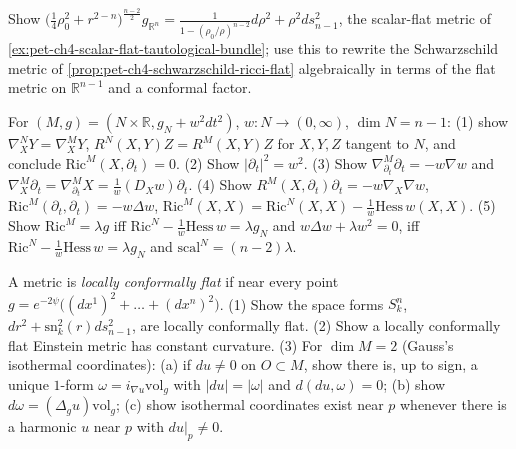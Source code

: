 \begin{remark}
  \label{rem:pet-ch4-ex-15}
  Show
  $\big(\tfrac14\rho_0^2+r^{2-n}\big)^{\frac{n-2}2}g_{\mathbb{R}^n}
  =\tfrac1{1-(\rho_0/\rho)^{n-2}}d\rho^2+\rho^2ds_{n-1}^2$, the scalar-flat
  metric of \cref{ex:pet-ch4-scalar-flat-tautological-bundle}; use this to
  rewrite the Schwarzschild metric of \cref{prop:pet-ch4-schwarzschild-ricci-flat}
  algebraically in terms of the flat metric on $\mathbb{R}^{n-1}$ and a conformal
  factor.
\end{remark}

\begin{remark}
  \label{rem:pet-ch4-ex-16}
  For $(M,g)=(N\times\mathbb{R},g_N+w^2dt^2)$, $w:N\to(0,\infty)$, $\dim N=n-1$: (1)
  show $\nabla^N_XY=\nabla^M_XY$, $R^N(X,Y)Z=R^M(X,Y)Z$ for $X,Y,Z$ tangent to
  $N$, and conclude $\mathrm{Ric}^M(X,\partial_t)=0$. (2) Show $|\partial_t|^2=w^2$.
  (3) Show $\nabla^M_{\partial_t}\partial_t=-w\nabla w$ and
  $\nabla^M_X\partial_t=\nabla^M_{\partial_t}X=\tfrac1w(D_Xw)\partial_t$. (4)
  Show $R^M(X,\partial_t)\partial_t=-w\nabla_X\nabla w$,
  $\mathrm{Ric}^M(\partial_t,\partial_t)=-w\Delta w$,
  $\mathrm{Ric}^M(X,X)=\mathrm{Ric}^N(X,X)-\tfrac1w\mathrm{Hess}\,w(X,X)$. (5) Show
  $\mathrm{Ric}^M=\lambda g$ iff $\mathrm{Ric}^N-\tfrac1w\mathrm{Hess}\,w=\lambda g_N$
  and $w\Delta w+\lambda w^2=0$, iff
  $\mathrm{Ric}^N-\tfrac1w\mathrm{Hess}\,w=\lambda g_N$ and $\mathrm{scal}^N=(n-2)\lambda$.
\end{remark}

\begin{remark}
  \label{rem:pet-ch4-ex-17}
  A metric is \emph{locally conformally flat} if near every point
  $g=e^{-2\psi}\big((dx^1)^2+\dots+(dx^n)^2\big)$. (1) Show the space forms
  $S^n_k$, $dr^2+\mathrm{sn}_k^2(r)ds_{n-1}^2$, are locally conformally flat. (2)
  Show a locally conformally flat Einstein metric has constant curvature. (3)
  For $\dim M=2$ (Gauss's isothermal coordinates): (a) if $du\ne0$ on
  $O\subset M$, show there is, up to sign, a unique $1$-form
  $\omega=i_{\nabla u}\mathrm{vol}_g$ with $|du|=|\omega|$ and
  $d(du,\omega)=0$; (b) show $d\omega=(\Delta_gu)\mathrm{vol}_g$; (c) show
  isothermal coordinates exist near $p$ whenever there is a harmonic $u$ near
  $p$ with $du|_p\ne0$.
\end{remark}


